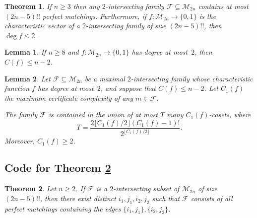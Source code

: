 \documentclass[10pt,a4paper]{amsart}
\newtheorem{theorem}{Theorem}
\newtheorem{lemma}{Lemma}
\providecommand{\cM}{\mathcal{M}}
\begin{document}
\begin{theorem} \label{thm:FMS}
If $n \geq 3$ then any $2$-intersecting family $\mathcal{F} \subseteq \cM_{2n}$ contains at most $(2n-5)!!$ perfect matchings. Furthermore, if $f\colon \cM_{2n} \to \{0,1\}$ is the characteristic vector of a $2$-intersecting family of size $(2n-5)!!$, then $\deg f \leq 2$.
\end{theorem}

\begin{lemma} \label{lem:C-bound-pms}
If $n \geq 8$ and $f\colon \cM_{2n} \to \{0,1\}$ has degree at most~$2$, then $C(f) \leq n-2$.
\end{lemma}

\begin{lemma} \label{lem:main-ub-pms}
Let $\mathcal{F} \subseteq \cM_{2n}$ be a maximal $2$-intersecting family whose characteristic function $f$ has degree at most~$2$, and suppose that $C(f) \leq n-2$. Let $C_1(f)$ the maximum certificate complexity of any $m \in \mathcal{F}$.

The family $\mathcal{F}$ is contained in the union of at most $T$ many $C_1(f)$-cosets, where
\[
 T = \frac{2\lfloor C_1(f)/2 \rfloor (C_1(f) - 1)!}{2^{\lfloor C_1(f)/2 \rfloor}}.
\]
Moreover, $C_1(f) \geq 2$.
\end{lemma}

\subsection{Code for Theorem \ref{thm:main-pms}} \label{apx:main-pms}

\begin{theorem} \label{thm:main-pms}
Let $n \geq 2$. If $\mathcal{F}$ is a $2$-intersecting subset of $\cM_{2n}$ of size $(2n-5)!!$, then there exist distinct $i_1,j_1,i_2,j_2$ such that $\mathcal{F}$ consists of all perfect matchings containing the edges $\{i_1,j_1\},\{i_2,j_2\}$.
\end{theorem}
\end{document}
